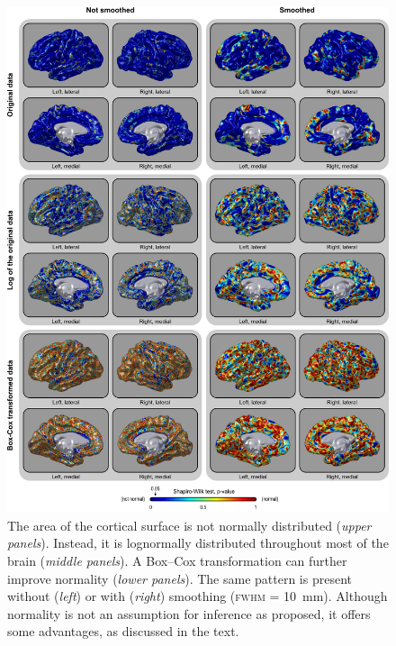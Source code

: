 \begin{figure}[!p]  %
\centering
\includegraphics[width=14cm]{images/shapiro.png}
\caption[The distribution of surface area is lognormal.]{The area of the cortical surface is not normally distributed (\emph{upper panels}). Instead, it is lognormally distributed throughout most of the brain (\emph{middle panels}). A Box--Cox transformation can further improve normality (\emph{lower panels}). The same pattern is present without (\emph{left}) or with (\emph{right}) smoothing (\textsc{fwhm} = 10~mm). Although normality is not an assumption for inference as proposed, it offers some advantages, as discussed in the text.}
\label{fig:areal:shapiro}
\end{figure}

